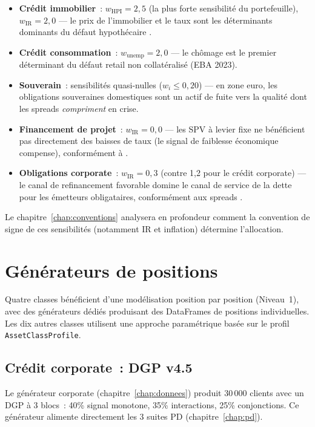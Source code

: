 \documentclass[12pt, a4paper, twoside, openright]{report}
\theoremstyle{definition}
\begin{document}
\begin{itemize}
\item \textbf{Crédit immobilier}~: $w_{\text{HPI}} = 2{,}5$ (la plus forte sensibilité du portefeuille), $w_{\text{IR}} = 2{,}0$ --- le prix de l'immobilier et le taux sont les déterminants dominants du défaut hypothécaire \citep{mian2009}.
\item \textbf{Crédit consommation}~: $w_{\text{unemp}} = 2{,}0$ --- le chômage est le premier déterminant du défaut retail non collatéralisé (EBA 2023).
\item \textbf{Souverain}~: sensibilités quasi-nulles ($w_i \leq 0{,}20$) --- en zone euro, les obligations souveraines domestiques sont un actif de fuite vers la qualité dont les spreads \emph{compriment} en crise.
\item \textbf{Financement de projet}~: $w_{\text{IR}} = 0{,}0$ --- les SPV à levier fixe ne bénéficient pas directement des baisses de taux (le signal de faiblesse économique compense), conformément à \citet{blanc2014}.
\item \textbf{Obligations corporate}~: $w_{\text{IR}} = 0{,}3$ (contre 1,2 pour le crédit corporate) --- le canal de refinancement favorable domine le canal de service de la dette pour les émetteurs obligataires, conformément aux spreads \citet{gilchrist2012}.
\end{itemize}

Le chapitre~\ref{chap:conventions} analysera en profondeur comment la convention de signe de ces sensibilités (notamment IR et inflation) détermine l'allocation.


\section{Générateurs de positions}
\label{sec:multi-generateurs}

Quatre classes bénéficient d'une modélisation position par position (Niveau~1), avec des générateurs dédiés produisant des DataFrames de positions individuelles. Les dix autres classes utilisent une approche paramétrique basée sur le profil \texttt{AssetClassProfile}.

\subsection{Crédit corporate~: DGP v4.5}

Le générateur corporate (chapitre~\ref{chap:donnees}) produit 30\,000 clients avec un DGP à 3 blocs~: 40\% signal monotone, 35\% interactions, 25\% conjonctions. Ce générateur alimente directement les 3 suites PD (chapitre~\ref{chap:pd}).
\end{document}
